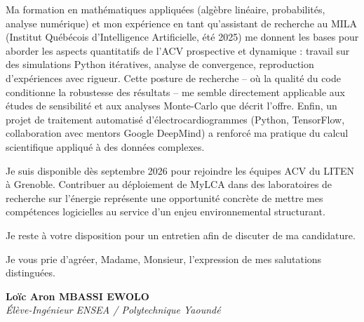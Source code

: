 \documentclass[a4paper,11pt]{article}
\begin{document}
Ma formation en mathématiques appliquées (algèbre linéaire, probabilités, analyse numérique) et mon expérience en tant qu'assistant de recherche au MILA (Institut Québécois d'Intelligence Artificielle, été 2025) me donnent les bases pour aborder les aspects quantitatifs de l'ACV prospective et dynamique : travail sur des simulations Python itératives, analyse de convergence, reproduction d'expériences avec rigueur. Cette posture de recherche -- où la qualité du code conditionne la robustesse des résultats -- me semble directement applicable aux études de sensibilité et aux analyses Monte-Carlo que décrit l'offre. Enfin, un projet de traitement automatisé d'électrocardiogrammes (Python, TensorFlow, collaboration avec mentors Google DeepMind) a renforcé ma pratique du calcul scientifique appliqué à des données complexes.

Je suis disponible dès septembre 2026 pour rejoindre les équipes ACV du LITEN à Grenoble. Contribuer au déploiement de MyLCA dans des laboratoires de recherche sur l'énergie représente une opportunité concrète de mettre mes compétences logicielles au service d'un enjeu environnemental structurant.

Je reste à votre disposition pour un entretien afin de discuter de ma candidature.

Je vous prie d'agréer, Madame, Monsieur, l'expression de mes salutations distinguées.

\vspace{0.8cm}

\textbf{Loïc Aron MBASSI EWOLO}\\
\textit{Élève-Ingénieur ENSEA / Polytechnique Yaoundé}
\end{document}
